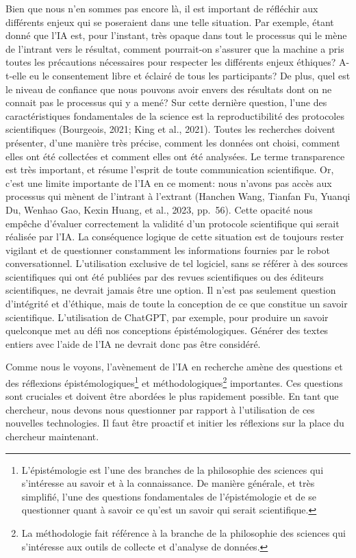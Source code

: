 \documentclass[
  letterpaper,
  DIV=11,
  numbers=noendperiod]{scrreprt}
\begin{document}
Bien que nous n'en sommes pas encore là, il est important de réfléchir
aux différents enjeux qui se poseraient dans une telle situation. Par
exemple, étant donné que l'IA est, pour l'instant, très opaque dans tout
le processus qui le mène de l'intrant vers le résultat, comment
pourrait-on s'assurer que la machine a pris toutes les précautions
nécessaires pour respecter les différents enjeux éthiques? A-t-elle eu
le consentement libre et éclairé de tous les participants? De plus, quel
est le niveau de confiance que nous pouvons avoir envers des résultats
dont on ne connait pas le processus qui y a mené? Sur cette dernière
question, l'une des caractéristiques fondamentales de la science est la
reproductibilité des protocoles scientifiques (Bourgeois, 2021; King et
al., 2021). Toutes les recherches doivent présenter, d'une manière très
précise, comment les données ont choisi, comment elles ont été
collectées et comment elles ont été analysées. Le terme transparence est
très important, et résume l'esprit de toute communication scientifique.
Or, c'est une limite importante de l'IA en ce moment: nous n'avons pas
accès aux processus qui mènent de l'intrant à l'extrant (Hanchen Wang,
Tianfan Fu, Yuanqi Du, Wenhao Gao, Kexin Huang, et al., 2023, pp.~56).
Cette opacité nous empêche d'évaluer correctement la validité d'un
protocole scientifique qui serait réalisée par l'IA. La conséquence
logique de cette situation est de toujours rester vigilant et de
questionner constamment les informations fournies par le robot
conversationnel. L'utilisation exclusive de tel logiciel, sans se
référer à des sources scientifiques qui ont été publiées par des revues
scientifiques ou des éditeurs scientifiques, ne devrait jamais être une
option. Il n'est pas seulement question d'intégrité et d'éthique, mais
de toute la conception de ce que constitue un savoir scientifique.
L'utilisation de ChatGPT, par exemple, pour produire un savoir
quelconque met au défi nos conceptions épistémologiques. Générer des
textes entiers avec l'aide de l'IA ne devrait donc pas être considéré.

Comme nous le voyons, l'avènement de l'IA en recherche amène des
questions et des réflexions épistémologiques\footnote{L'épistémologie
  est l'une des branches de la philosophie des sciences qui s'intéresse
  au savoir et à la connaissance. De manière générale, et très
  simplifié, l'une des questions fondamentales de l'épistémologie et de
  se questionner quant à savoir ce qu'est un savoir qui serait
  scientifique.} et méthodologiques\footnote{La méthodologie fait
  référence à la branche de la philosophie des sciences qui s'intéresse
  aux outils de collecte et d'analyse de données.} importantes. Ces
questions sont cruciales et doivent être abordées le plus rapidement
possible. En tant que chercheur, nous devons nous questionner par
rapport à l'utilisation de ces nouvelles technologies. Il faut être
proactif et initier les réflexions sur la place du chercheur maintenant.
\end{document}
